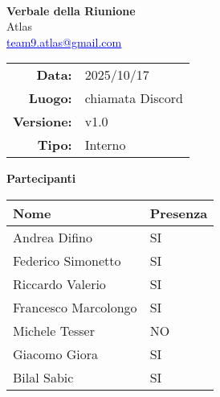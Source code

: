 \documentclass[a4paper,12pt]{article}
\makeatletter
\newcommand{\Gruppo}{Atlas}
\newcommand{\Email}{\href{mailto:team9.atlas@gmail.com}{\textcolor{blue}{\underline{team9.atlas@gmail.com}}}}
\newcommand{\TitoloVerbale}{Verbale della Riunione}
\newcommand{\DataVerbale}{2025/10/17}
\newcommand{\LuogoVerbale}{chiamata Discord}
\newcommand{\LogoGruppo}{img/AtlasLogo.png} %
\newcommand{\VersioneVerbale}{v1.0} %
\newcommand{\VerbaleInterno}{Interno}
\makeatother
\begin{document}
\begin{titlepage}
    \centering

    \vspace*{0cm}
    \\
    [.5cm]
    {\Huge \textbf{\TitoloVerbale}}\\[0.8cm]
    {\LARGE \Gruppo}\\[0.1cm]
    {\Email}\\[1.2cm]

    \begin{tabular}{rl}
        \textbf{Data:} & \DataVerbale \\
        \textbf{Luogo:} & \LuogoVerbale \\
        \textbf{Versione:} & \VersioneVerbale \\
        \textbf{Tipo:} & \VerbaleInterno \\
    \end{tabular}

    \vspace{1.2cm}

    {\large \textbf{Partecipanti}}\\[0.5cm]
    \begin{tabular}{l|l}
        \textbf{Nome} & \textbf{Presenza} \\
        \hline
        Andrea Difino & SI \\
        Federico Simonetto & SI \\
        Riccardo Valerio & SI \\
        Francesco Marcolongo & SI \\
        Michele Tesser & NO \\
        Giacomo Giora & SI \\
        Bilal Sabic & SI \\
    \end{tabular}

\end{titlepage}
\end{document}
